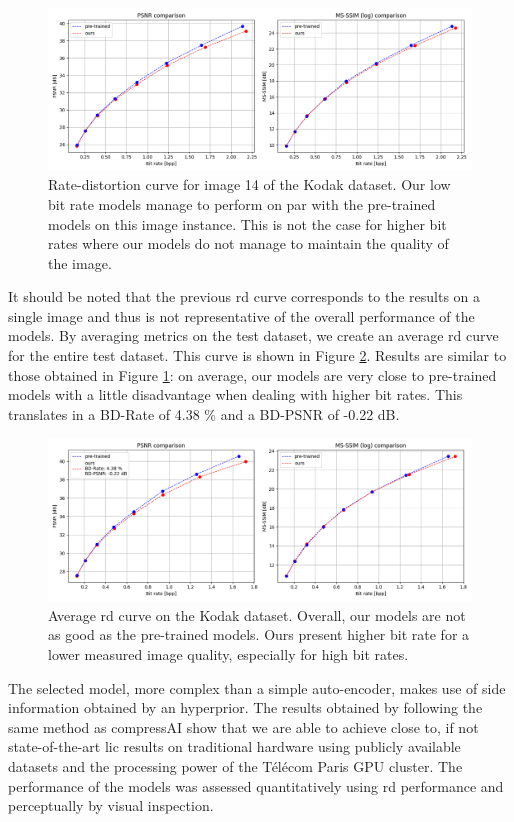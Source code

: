 \begin{figure}
    \centering
    \includegraphics[width=15cm]{img/bdpsnr_rd_kodak_14.png}
    \caption[Rate-distortion curve for image 14 of the Kodak dataset.]{Rate-distortion curve for image 14 of the Kodak dataset. Our low bit rate models manage to perform on par with the pre-trained models on this image instance. This is not the case for higher bit rates where our models do not manage to maintain the quality of the image.}
    \label{bdpsnr_2}
\end{figure}

It should be noted that the previous \acrshort{rd} curve corresponds to the results on a single image and thus is not representative of the overall performance of the models. By averaging metrics on the test dataset, we create an average \acrshort{rd} curve for the entire test dataset. This curve is shown in Figure \ref{bdpsnr_3}. Results are similar to those obtained in Figure \ref{bdpsnr_2}: on average, our models are very close to pre-trained models with a little disadvantage when dealing with higher bit rates. This translates in a BD-Rate of 4.38 \% and a BD-PSNR of -0.22 dB.

\begin{figure}
    \centering
    \includegraphics[width=15cm]{img/bdpsnr_rd.png}
    \caption[Average \acrshort{rd} curve on the Kodak dataset.]{Average \acrshort{rd} curve on the Kodak dataset. Overall, our models are not as good as the pre-trained models. Ours present higher bit rate for a lower measured image quality, especially for high bit rates.}
    \label{bdpsnr_3}
\end{figure}

The selected model, more complex than a simple auto-encoder, makes use of side information obtained by an hyperprior. The results obtained by following the same method as compressAI show that we are able to achieve close to, if not state-of-the-art \acrshort{lic} results on traditional hardware using publicly available datasets and the processing power of the Télécom Paris GPU cluster. The performance of the models was assessed quantitatively using \acrshort{rd} performance and perceptually by visual inspection.